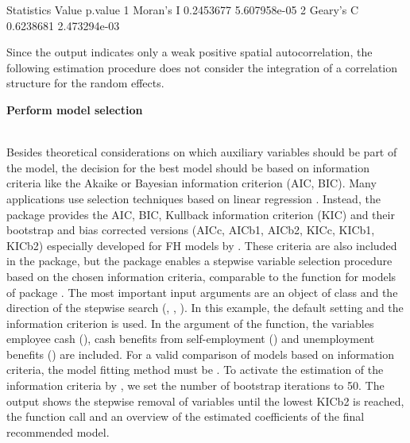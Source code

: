 \begin{minipage}{0.63\textwidth}
\begin{example}
 Statistics     Value      p.value
1 Moran's I 0.2453677 5.607958e-05
2 Geary's C 0.6238681 2.473294e-03
\end{example}
Since the output indicates only a weak positive spatial autocorrelation, the
following estimation procedure does not consider the integration of a correlation
structure for the random effects.
\end{minipage}
\newpage
{\raggedright
\textbf{Perform model selection}} \\
Besides theoretical considerations on which auxiliary variables should be part
of the model, the decision for the best model should be based on information
criteria like the Akaike or Bayesian information criterion (AIC, BIC). Many
applications use selection techniques based on linear regression
\citep{Casas2016, Schmid2017}. Instead, the  package provides the AIC, BIC, Kullback information criterion (KIC) and their bootstrap and bias corrected
versions (AICc, AICb1, AICb2, KICc, KICb1, KICb2) especially developed for FH
models by \citet{Marhuenda2014}. These criteria are also included in the
 package, but the  package enables a stepwise variable selection procedure
based on the chosen information criteria, comparable to the  function
for  models of package . The most important input arguments are an object of class  and the
direction of the stepwise search (, ,
). In this example, the default setting  and
the  information criterion is used. In the  argument
of the  function, the variables employee cash (), cash benefits from self-employment () and unemployment benefits () are included.
For a valid comparison of models based on information criteria, the model fitting method must be
. To activate the estimation of the information criteria by \citet{Marhuenda2014}, we set the number of bootstrap iterations to 50. The output shows the stepwise removal of variables until the lowest KICb2 is reached, the function call and an overview of the estimated
coefficients of the final recommended model.
